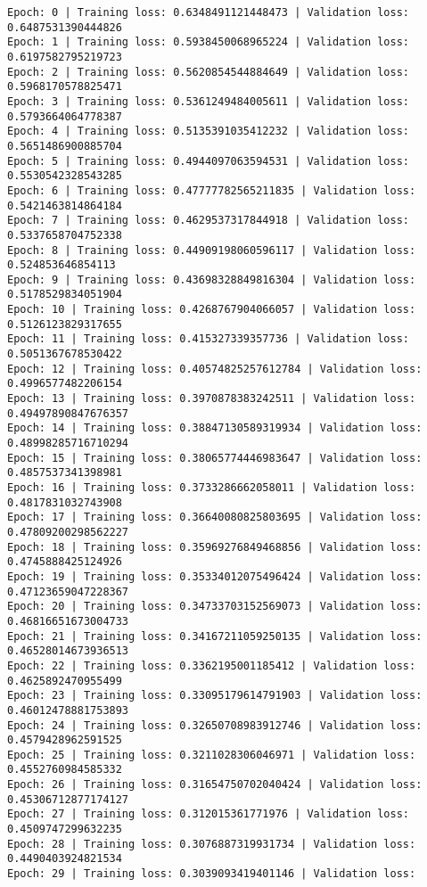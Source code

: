 \documentclass[11pt]{article}
\begin{document}
    \begin{Verbatim}[commandchars=\\\{\}]
Epoch: 0 | Training loss: 0.6348491121448473 | Validation loss:
0.6487531390444826
Epoch: 1 | Training loss: 0.5938450068965224 | Validation loss:
0.6197582795219723
Epoch: 2 | Training loss: 0.5620854544884649 | Validation loss:
0.5968170578825471
Epoch: 3 | Training loss: 0.5361249484005611 | Validation loss:
0.5793664064778387
Epoch: 4 | Training loss: 0.5135391035412232 | Validation loss:
0.5651486900885704
Epoch: 5 | Training loss: 0.4944097063594531 | Validation loss:
0.5530542328543285
Epoch: 6 | Training loss: 0.47777782565211835 | Validation loss:
0.5421463814864184
Epoch: 7 | Training loss: 0.4629537317844918 | Validation loss:
0.5337658704752338
Epoch: 8 | Training loss: 0.44909198060596117 | Validation loss:
0.524853646854113
Epoch: 9 | Training loss: 0.43698328849816304 | Validation loss:
0.5178529834051904
Epoch: 10 | Training loss: 0.4268767904066057 | Validation loss:
0.5126123829317655
Epoch: 11 | Training loss: 0.415327339357736 | Validation loss:
0.5051367678530422
Epoch: 12 | Training loss: 0.40574825257612784 | Validation loss:
0.4996577482206154
Epoch: 13 | Training loss: 0.3970878383242511 | Validation loss:
0.49497890847676357
Epoch: 14 | Training loss: 0.38847130589319934 | Validation loss:
0.48998285716710294
Epoch: 15 | Training loss: 0.38065774446983647 | Validation loss:
0.4857537341398981
Epoch: 16 | Training loss: 0.3733286662058011 | Validation loss:
0.4817831032743908
Epoch: 17 | Training loss: 0.36640080825803695 | Validation loss:
0.47809200298562227
Epoch: 18 | Training loss: 0.35969276849468856 | Validation loss:
0.4745888425124926
Epoch: 19 | Training loss: 0.35334012075496424 | Validation loss:
0.47123659047228367
Epoch: 20 | Training loss: 0.34733703152569073 | Validation loss:
0.46816651673004733
Epoch: 21 | Training loss: 0.34167211059250135 | Validation loss:
0.46528014673936513
Epoch: 22 | Training loss: 0.3362195001185412 | Validation loss:
0.4625892470955499
Epoch: 23 | Training loss: 0.33095179614791903 | Validation loss:
0.46012478881753893
Epoch: 24 | Training loss: 0.32650708983912746 | Validation loss:
0.4579428962591525
Epoch: 25 | Training loss: 0.3211028306046971 | Validation loss:
0.4552760984585332
Epoch: 26 | Training loss: 0.31654750702040424 | Validation loss:
0.45306712877174127
Epoch: 27 | Training loss: 0.312015361771976 | Validation loss:
0.4509747299632235
Epoch: 28 | Training loss: 0.3076887319931734 | Validation loss:
0.4490403924821534
Epoch: 29 | Training loss: 0.3039093419401146 | Validation loss:

\end{Verbatim}
\end{document}
